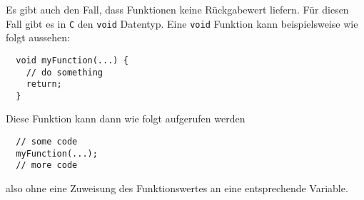 Es gibt auch den Fall, dass Funktionen keine Rückgabewert liefern.
Für diesen Fall gibt es in \texttt{C} den \verb|void| Datentyp.
Eine \verb|void| Funktion kann beispielsweise wie folgt aussehen:
\begin{lstlisting}
  void myFunction(...) {
    // do something
    return;
  }
\end{lstlisting}
Diese Funktion kann dann wie folgt aufgerufen werden
\begin{lstlisting}
  // some code
  myFunction(...);
  // more code
\end{lstlisting}
also ohne eine Zuweisung des Funktionswertes an eine entsprechende Variable.
\endinput
